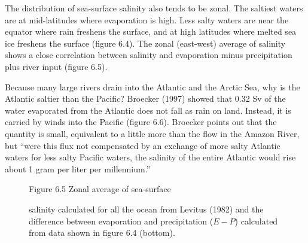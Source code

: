 The distribution of sea-surface salinity also tends to be zonal. The
saltiest waters are at mid-latitudes where evaporation is high. Less
salty waters are near the equator where rain freshens the surface, and
at high latitudes where melted sea ice freshens the surface (figure
6.4). The zonal (east-west) average of salinity shows a close
correlation between salinity and evaporation minus precipitation plus
river input (figure 6.5).

Because many large rivers drain into the Atlantic and the Arctic Sea,
why is the Atlantic saltier than the Pacific? Broecker (1997) showed
that 0.32 Sv of the water evaporated from the Atlantic does not fall
as rain on land. Instead, it is carried by winds into the Pacific
(figure 6.6). Broecker points out that the quantity is small,
equivalent to a little more than the flow in the Amazon River, but
``were this flux not compensated by an exchange of more salty Atlantic
waters for less salty Pacific waters, the salinity of the entire
Atlantic would rise about 1 gram per liter per millennium.''

\begin{figure}[t!]
\footnotesize
Figure 6.5 Zonal average of sea-surface \rule{0mm}{3ex}salinity
calculated for all the ocean from Levitus (1982) and the difference
between evaporation and precipitation ($E - P$) calculated from data
shown in figure 6.4 (bottom).
\label{fig:zonalsalinity}
\vspace{-5ex}
\end{figure}


